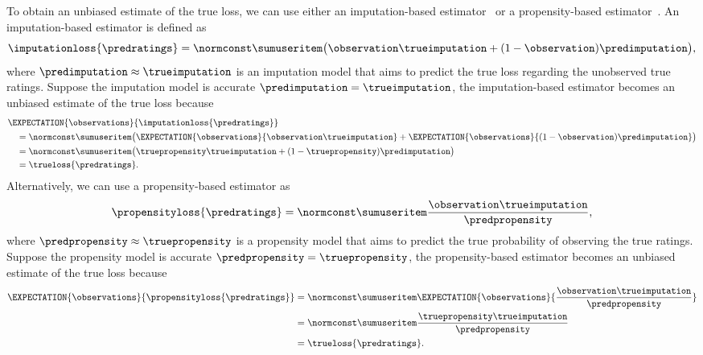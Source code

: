 To obtain an unbiased estimate of the true loss, we can use either an imputation-based estimator~\cite{steck2010training} or a propensity-based estimator~\cite{schnabel2016recommendations}.
An imputation-based estimator is defined as 
\begin{equation}
\begin{aligned}
\imputationloss{\predratings}
=
\normconst\sumuseritem
\big(
\observation\trueimputation
+
(1-\observation)\predimputation
\big)
\text{,}
\end{aligned}
\end{equation}%
where $\predimputation\approx\trueimputation$ is an imputation model that aims to predict the true loss regarding the unobserved true ratings.
Suppose the imputation model is accurate $\predimputation=\trueimputation$, the imputation-based estimator becomes an unbiased estimate of the true loss because
\begin{equation}
\begin{aligned}
&
\EXPECTATION{\observations}{\imputationloss{\predratings}}
\\
&\quad
=
\normconst\sumuseritem
\big(
\EXPECTATION{\observations}{\observation\trueimputation}
+
\EXPECTATION{\observations}{(1-\observation)\predimputation}
\big)
\\
&\quad
=
\normconst\sumuseritem
\big(
\truepropensity\trueimputation
+
(1-\truepropensity)\predimputation
\big)
\\
&\quad
=
\trueloss{\predratings}
\text{.}
\end{aligned}
\end{equation}%
Alternatively, we can use a propensity-based estimator as 
\begin{equation}
\begin{aligned}
\propensityloss{\predratings}
=
\normconst\sumuseritem
\frac{\observation\trueimputation}{\predpropensity}
\text{,}
\end{aligned}
\end{equation}%
where $\predpropensity\approx\truepropensity$ is a propensity model that aims to predict the true probability of observing the true ratings.
Suppose the propensity model is accurate $\predpropensity=\truepropensity$, the propensity-based estimator becomes an unbiased estimate of the true loss because
\begin{equation}
\begin{aligned}
\EXPECTATION{\observations}{\propensityloss{\predratings}}
&
=
\normconst\sumuseritem
\EXPECTATION{\observations}{\frac{\observation\trueimputation}{\predpropensity}}
\\
&
=
\normconst\sumuseritem
\frac{\truepropensity\trueimputation}{\predpropensity}
\\
&
=
\trueloss{\predratings}
\text{.}
\end{aligned}
\end{equation}%

